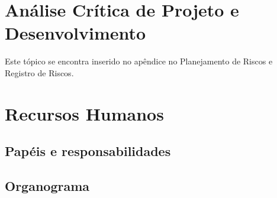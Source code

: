 \section{Análise Crítica de Projeto e Desenvolvimento}
    Este tópico se encontra inserido no apêndice no Planejamento de Riscos e Registro de Riscos.

\section{Recursos Humanos}
\subsection{Papéis e responsabilidades}

\subsection{Organograma}    

    
    


